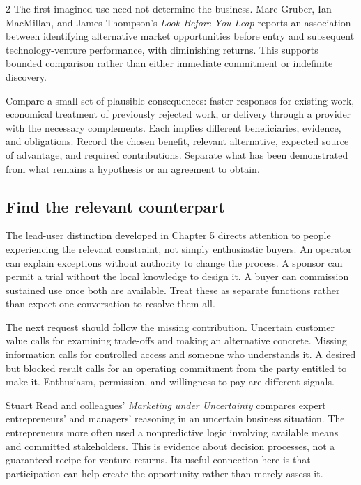 \begin{multicols}{2}
The first imagined use need not determine the business. Marc Gruber, Ian
MacMillan, and James Thompson's \emph{Look Before You Leap}
\citep{gruber2008opportunities} reports an association between
identifying alternative market opportunities before entry and subsequent
technology-venture performance, with diminishing returns. This supports
bounded comparison rather than either immediate commitment or indefinite
discovery.

Compare a small set of plausible consequences: faster responses for
existing work, economical treatment of previously rejected work, or
delivery through a provider with the necessary complements. Each implies
different beneficiaries, evidence, and obligations. Record the chosen
benefit, relevant alternative, expected source of advantage, and
required contributions. Separate what has been demonstrated from what
remains a hypothesis or an agreement to obtain.

\subsection{Find the relevant
counterpart}\label{find-the-relevant-counterpart}

The lead-user distinction \citep{vonhippel1986leadusers} developed in
Chapter 5 directs attention to people experiencing the relevant
constraint, not simply enthusiastic buyers. An operator can explain
exceptions without authority to change the process. A sponsor can permit
a trial without the local knowledge to design it. A buyer can commission
sustained use once both are available. Treat these as separate functions
rather than expect one conversation to resolve them all.

The next request should follow the missing contribution. Uncertain
customer value calls for examining trade-offs and making an alternative
concrete. Missing information calls for controlled access and someone
who understands it. A desired but blocked result calls for an operating
commitment from the party entitled to make it. Enthusiasm, permission,
and willingness to pay are different signals.

Stuart Read and colleagues' \emph{Marketing under Uncertainty}
\citep{read2009marketing} compares expert entrepreneurs' and managers'
reasoning in an uncertain business situation. The entrepreneurs more
often used a nonpredictive logic involving available means and committed
stakeholders. This is evidence about decision processes, not a
guaranteed recipe for venture returns. Its useful connection here is
that participation can help create the opportunity rather than merely
assess it.


\end{multicols}
